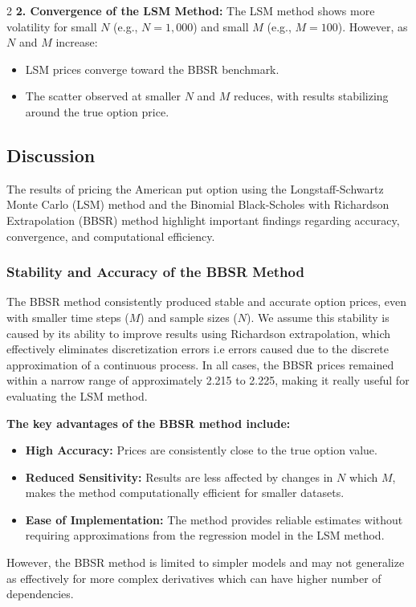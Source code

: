 \begin{multicols}{2}
\textbf{2. Convergence of the LSM Method:}  
The LSM method shows more volatility for small \(N\) (e.g., \(N = 1,000\)) and small \(M\) (e.g., \(M = 100\)). However, as \(N\) and \(M\) increase:
\begin{itemize}
    \item LSM prices converge toward the BBSR benchmark.
    \item The scatter observed at smaller \(N\) and \(M\) reduces, with results stabilizing around the true option price.
\end{itemize}
\subsection{Discussion}
The results of pricing the American put option using the Longstaff-Schwartz Monte Carlo (LSM) method and the Binomial Black-Scholes with Richardson Extrapolation (BBSR) method highlight important findings regarding accuracy, convergence, and computational efficiency.

\subsubsection{Stability and Accuracy of the BBSR Method}
The BBSR method consistently produced stable and accurate option prices, even with smaller time steps (\(M\)) and sample sizes (\(N\)). We assume this stability is caused by its ability to improve results using Richardson extrapolation, which effectively eliminates discretization errors i.e errors caused due to the discrete approximation of a continuous process. In all cases, the BBSR prices remained within a narrow range of approximately 2.215 to 2.225, making it really useful for evaluating the LSM method.

\textbf{The key advantages of the BBSR method include:}
\begin{itemize}
    \item \textbf{High Accuracy:} Prices are consistently close to the true option value.
    \item \textbf{Reduced Sensitivity:} Results are less affected by changes in \(N\) which \(M\), makes the method computationally efficient for smaller datasets.
    \item \textbf{Ease of Implementation:} The method provides reliable estimates without requiring approximations from the regression model in the LSM method.
\end{itemize}
However, the BBSR method is limited to simpler models and may not generalize as effectively for more complex derivatives which can have higher number of dependencies.


\end{multicols}
